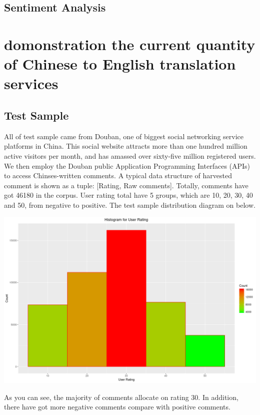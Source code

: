 \documentclass[conference]{IEEEtran}
\begin{document}
\begin{CJK*}{UTF8}{gbsn}
\subsection{Sentiment Analysis}

\section{domonstration the current quantity of Chinese to English translation services}

\subsection{Test Sample}
All of test sample came from Douban, one of biggest social networking service
platforms in China. This social website attracts more than one hundred million
active visitors per month, and has amassed over sixty-five million registered
users. We then employ the Douban public Application Programming Interfaces
(APIs) to access Chinses-written comments. A typical data structure of harvested
comment is shown as a tuple: [Rating, Raw comments]. Totally, comments have got
46180 in the corpus. User rating total have 5 groups, which are 10, 20, 30, 40
and 50, from negative to positive.
The test sample distribution diagram on below.
\centerline{\includegraphics[width=0.3\paperwidth]{./img/ratingHis.png}}
As you can see, the majority of comments allocate on rating 30. In addition,
there have got more negative comments compare with positive comments.


\end{CJK*}
\end{document}
